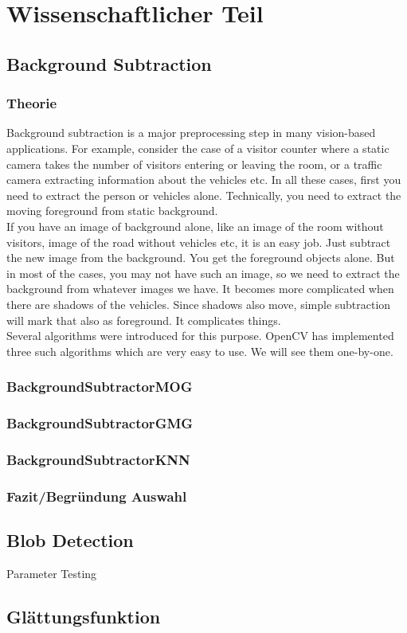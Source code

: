 \chapter{Wissenschaftlicher Teil}
\section{Background Subtraction}
\subsection{Theorie}
Background subtraction is a major preprocessing step in many vision-based applications. For example, consider the case of a visitor counter where a static camera takes the number of visitors entering or leaving the room, or a traffic camera extracting information about the vehicles etc. In all these cases, first you need to extract the person or vehicles alone. Technically, you need to extract the moving foreground from static background. \\
If you have an image of background alone, like an image of the room without visitors, image of the road without vehicles etc, it is an easy job. Just subtract the new image from the background. You get the foreground objects alone. But in most of the cases, you may not have such an image, so we need to extract the background from whatever images we have. It becomes more complicated when there are shadows of the vehicles. Since shadows also move, simple subtraction will mark that also as foreground. It complicates things. \\
Several algorithms were introduced for this purpose. OpenCV has implemented three such algorithms which are very easy to use. We will see them one-by-one.
\subsection{BackgroundSubtractorMOG}
\cite{Bowden}
\subsection{BackgroundSubtractorGMG}
\subsection{BackgroundSubtractorKNN}
\subsection{Fazit/Begründung Auswahl}
\section{Blob Detection}
Parameter Testing
\section{Glättungsfunktion}